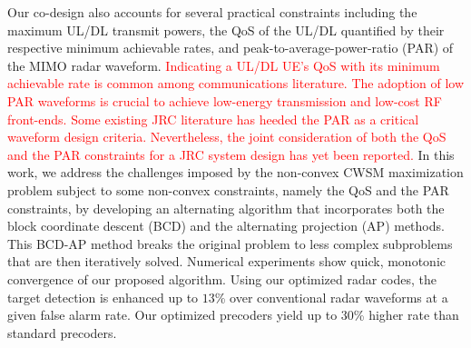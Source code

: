 \documentclass[10pt,journal]{IEEEtran}
\theoremstyle{definition}
\begin{document}
Our co-design also accounts for several practical constraints including the maximum UL/DL transmit powers, the QoS of the UL/DL quantified by their respective minimum achievable rates, and peak-to-average-power-ratio (PAR) of the MIMO radar waveform. %
\textcolor{red}{Indicating a UL/DL UE's QoS with its minimum achievable rate is common among communications literature\cite{MIMOCOMSecrecy}. The adoption of low PAR waveforms is crucial to achieve low-energy transmission and low-cost RF front-ends\cite{liu2018toward}. Some existing JRC literature\cite{Petropulu2020dfrc,liu2018toward} has heeded the PAR as a critical waveform design criteria. Nevertheless, the joint consideration of both the QoS and the PAR constraints for a JRC system design has yet been reported.} In this work, we address the challenges imposed by the non-convex CWSM maximization problem subject to some non-convex constraints, namely the QoS and the PAR constraints, by developing an alternating algorithm that incorporates both the block coordinate descent (BCD) and the alternating projection (AP) methods. This BCD-AP method breaks the original problem to less complex subproblems that are then iteratively solved. Numerical experiments show quick, monotonic convergence of our proposed algorithm. Using our optimized radar codes, the target detection is enhanced up to $13$\% over conventional radar waveforms at a given false alarm rate. Our optimized precoders yield up to $30$\% higher rate than standard precoders. %
\end{document}
